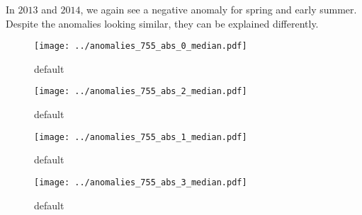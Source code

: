 \documentclass[preprint, a4paper, 10pt, times]{elsarticle}
\begin{document}
In $2013$ and $2014$, we again see a negative anomaly for spring and early summer. Despite the anomalies looking similar, they can be explained differently. 

\begin{figure}[htbp]
\centering
\texttt{[image: ../anomalies\_755\_abs\_0\_median.pdf]}
\caption{default}
\label{fig:anomalies_0}
\end{figure}

\begin{figure}[htbp]
\centering
\texttt{[image: ../anomalies\_755\_abs\_2\_median.pdf]}
\caption{default}
\label{fig:anomalies_2}
\end{figure}


\begin{figure}[htbp]
\centering
\texttt{[image: ../anomalies\_755\_abs\_1\_median.pdf]}
\caption{default}
\label{fig:anomalies_1}
\end{figure}

\begin{figure}[htbp]
\centering
\texttt{[image: ../anomalies\_755\_abs\_3\_median.pdf]}
\caption{default}
\label{fig:anomalies_3}
\end{figure}

\section*{}

\end{document}
